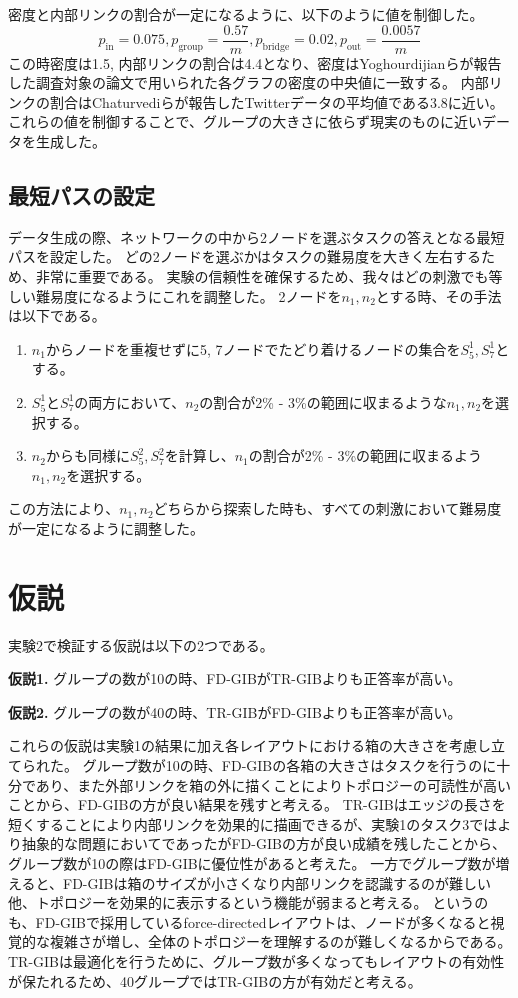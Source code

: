 \documentclass{kuee}
\begin{document}
密度と内部リンクの割合が一定になるように、以下のように値を制御した。
\[
  p_{\text{in}} = 0.075, p_{\text{group}} = \frac{0.57}{m}, p_{\text{bridge}} = 0.02, p_{\text{out}} = \frac{0.0057}{m}
\]
この時密度は1.5, 内部リンクの割合は4.4となり、密度はYoghourdijianら\cite{yoghourdjian2018exploring}が報告した調査対象の論文で用いられた各グラフの密度の中央値に一致する。
内部リンクの割合はChaturvediら\cite{chaturvedi2014group}が報告したTwitterデータの平均値である3.8に近い。
これらの値を制御することで、グループの大きさに依らず現実のものに近いデータを生成した。

\subsection{最短パスの設定}
\label{subsec:shortest_path}
データ生成の際、ネットワークの中から2ノードを選ぶタスクの答えとなる最短パスを設定した。
どの2ノードを選ぶかはタスクの難易度を大きく左右するため、非常に重要である。
実験の信頼性を確保するため、我々はどの刺激でも等しい難易度になるようにこれを調整した。
2ノードを$n_1, n_2$とする時、その手法は以下である。
\begin{enumerate}
  \item $n_1$からノードを重複せずに5, 7ノードでたどり着けるノードの集合を$S_5^1, S_7^1$とする。
  \item $S_5^1$と$S_7^1$の両方において、$n_2$の割合が2\% - 3\%の範囲に収まるような$n_1, n_2$を選択する。
  \item $n_2$からも同様に$S_5^2, S_7^2$を計算し、$n_1$の割合が2\% - 3\%の範囲に収まるよう$n_1, n_2$を選択する。
\end{enumerate}
この方法により、$n_1, n_2$どちらから探索した時も、すべての刺激において難易度が一定になるように調整した。


\section{仮説}
\label{subsec:hypothesis-ex2}
実験2で検証する仮説は以下の2つである。
\begin{description}
  \item{\bf 仮説1.} グループの数が10の時、FD-GIBがTR-GIBよりも正答率が高い。
  \item{\bf 仮説2.} グループの数が40の時、TR-GIBがFD-GIBよりも正答率が高い。
\end{description}
これらの仮説は実験1の結果に加え各レイアウトにおける箱の大きさを考慮し立てられた。
グループ数が10の時、FD-GIBの各箱の大きさはタスクを行うのに十分であり、また外部リンクを箱の外に描くことによりトポロジーの可読性が高いことから、FD-GIBの方が良い結果を残すと考える。
TR-GIBはエッジの長さを短くすることにより内部リンクを効果的に描画できるが、実験1のタスク3ではより抽象的な問題においてであったがFD-GIBの方が良い成績を残したことから、グループ数が10の際はFD-GIBに優位性があると考えた。
一方でグループ数が増えると、FD-GIBは箱のサイズが小さくなり内部リンクを認識するのが難しい他、トポロジーを効果的に表示するという機能が弱まると考える。
というのも、FD-GIBで採用しているforce-directedレイアウトは、ノードが多くなると視覚的な複雑さが増し、全体のトポロジーを理解するのが難しくなるからである。
TR-GIBは最適化を行うために、グループ数が多くなってもレイアウトの有効性が保たれるため、40グループではTR-GIBの方が有効だと考える。
\end{document}
